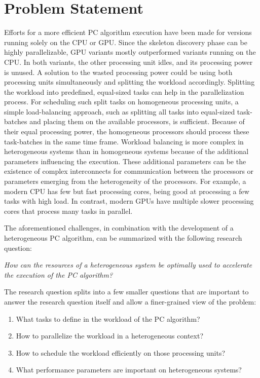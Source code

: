 \chapter{Problem Statement}
\label{chap:problem_statement}
Efforts for a more efficient PC algorithm execution have been made for versions running solely on the CPU or GPU. Since the skeleton discovery phase can be highly parallelizable, GPU variants mostly outperformed variants running on the CPU. In both variants, the other processing unit idles, and its processing power is unused. A solution to the wasted processing power could be using both processing units simultaneously and splitting the workload accordingly.
Splitting the workload into predefined, equal-sized tasks can help in the parallelization process. For scheduling such split tasks on homogeneous processing units, a simple load-balancing approach, such as splitting all tasks into equal-sized task-batches and placing them on the available processors, is sufficient.
Because of their equal processing power, the homogeneous processors should process these task-batches in the same time frame.
Workload balancing is more complex in heterogeneous systems than in homogeneous systems because of the additional parameters influencing the execution. These additional parameters can be the existence of complex interconnects for communication between the processors or parameters emerging from the heterogeneity of the processors. For example, a modern CPU has few but fast processing cores, being good at processing a few tasks with high load. In contrast, modern GPUs have multiple slower processing cores that process many tasks in parallel.

The aforementioned challenges, in combination with the development of a heterogeneous PC algorithm, can be summarized with the following research question:

\textit{How can the resources of a heterogeneous system be optimally used to accelerate the execution of the PC algorithm?}

The research question splits into a few smaller questions that are important to answer the research question itself and allow a finer-grained view of the problem:

\begin{enumerate}
  \item What tasks to define in the workload of the PC algorithm?
  \item How to parallelize the workload in a heterogeneous context?
  \item How to schedule the workload efficiently on those processing units?
  \item What performance parameters are important on heterogeneous systems?
\end{enumerate}

